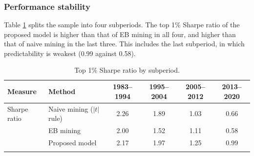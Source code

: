 \documentclass[pdflatex,sn-mathphys-num]{sn-jnl}%
\theoremstyle{thmstyleone}%
\theoremstyle{thmstyletwo}%
\theoremstyle{thmstylethree}%
\begin{document}
\subsubsection{Performance stability}
Table \ref{tab:subperiod} splits the sample into four subperiods. The top 1\% Sharpe ratio of the proposed model is higher than that of EB mining in all four, and higher than that of naive mining in the last three. This includes the last subperiod, in which predictability is weakest (0.99 against 0.58).

\begin{table}[h]
\caption{Top 1\% Sharpe ratio by subperiod.}\label{tab:subperiod}%
\small
\begin{tabular}{@{}llcccc@{}}
\toprule
Measure & Method & 1983--1994 & 1995--2004 & 2005--2012 & 2013--2020 \\
\midrule
Sharpe ratio & Naive mining ($|t|$ rule) & 2.26 & 1.89 & 1.03 & 0.66 \\
 & EB mining & 2.00 & 1.52 & 1.11 & 0.58 \\
 & Proposed model & 2.17 & 1.97 & 1.25 & 0.99 \\
\botrule
\end{tabular}
\end{table}


\end{document}

